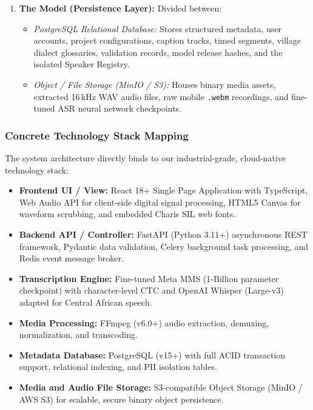 \documentclass[a4paper,11pt]{article}
\begin{document}
\begin{enumerate}
\begin{itemize}
    \end{itemize}
    \item \textbf{The Model (Persistence Layer):} Divided between:
    \begin{itemize}
        \item \textit{PostgreSQL Relational Database:} Stores structured metadata, user accounts, project configurations, caption tracks, timed segments, village dialect glossaries, validation records, model release hashes, and the isolated Speaker Registry.
        \item \textit{Object / File Storage (MinIO / S3):} Houses binary media assets, extracted 16\,kHz WAV audio files, raw mobile \texttt{.webm} recordings, and fine-tuned ASR neural network checkpoints.
    \end{itemize}
\end{enumerate}

\subsubsection{Concrete Technology Stack Mapping}
\label{sec:chap3_arch_techstack}
The system architecture directly binds to our industrial-grade, cloud-native technology stack:
\begin{itemize}
    \item \textbf{Frontend UI / View:} React 18+ Single Page Application with TypeScript, Web Audio API for client-side digital signal processing, HTML5 Canvas for waveform scrubbing, and embedded Charis SIL web fonts.
    \item \textbf{Backend API / Controller:} FastAPI (Python 3.11+) asynchronous REST framework, Pydantic data validation, Celery background task processing, and Redis event message broker.
    \item \textbf{Transcription Engine:} Fine-tuned Meta MMS (1-Billion parameter checkpoint) with character-level CTC and OpenAI Whisper (Large-v3) adapted for Central African speech.
    \item \textbf{Media Processing:} FFmpeg (v6.0+) audio extraction, demuxing, normalization, and transcoding.
    \item \textbf{Metadata Database:} PostgreSQL (v15+) with full ACID transaction support, relational indexing, and PII isolation tables.
    \item \textbf{Media and Audio File Storage:} S3-compatible Object Storage (MinIO / AWS S3) for scalable, secure binary object persistence.
\end{itemize}
\end{document}
